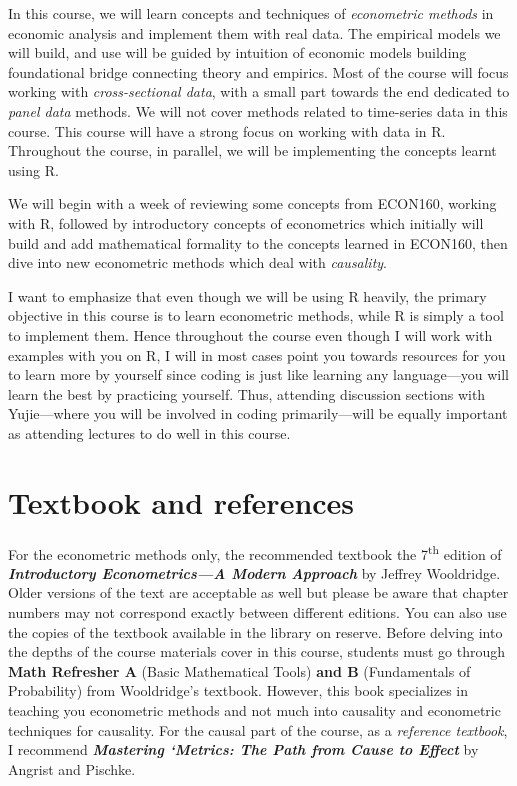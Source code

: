 \documentclass[11pt]{article}
\newcommand{\TAShort}{Yujie}
\begin{document}
In this course, we will learn concepts and techniques of \emph{econometric
methods} in economic analysis and implement them with real data. The empirical
models we will build, and use will be guided by intuition of economic models
building foundational bridge connecting theory and empirics. Most of the course
will focus working with \emph{cross-sectional data}, with a small part towards
the end dedicated to \emph{panel data} methods. We will not cover methods
related to time-series data in this course. This course will have a strong focus
on working with data in R. Throughout the course, in parallel, we will be
implementing the concepts learnt using R.

We will begin with a week of reviewing some concepts from ECON160, working with
R, followed by introductory concepts of econometrics which initially will build
and add mathematical formality to the concepts learned in ECON160, then dive
into new econometric methods which deal with \emph{causality}.

I want to emphasize that even though we will be using R heavily, the primary
objective in this course is to learn econometric methods, while R is simply a
tool to implement them. Hence throughout the course even though I will work with
examples with you on R, I will in most cases point you towards resources for you
to learn more by yourself since coding is just like learning any
language---you will learn the best by practicing yourself. Thus, attending
discussion sections with \TAShort---where you will be involved in coding
primarily---will be equally important as attending lectures to do well in this
course.

\section{Textbook and references}

For the econometric methods only, the recommended textbook the
7\textsuperscript{th} edition of \textbf{\emph{Introductory Econometrics---A
Modern Approach}} by Jeffrey Wooldridge. Older versions of the text are
acceptable as well but please be aware that chapter numbers may not correspond
exactly between different editions. You can also use the copies of the textbook
available in the library on reserve. Before delving into the depths of the
course materials cover in this course, students must go through \textbf{Math
Refresher A} (Basic Mathematical Tools) \textbf{and B} (Fundamentals of
Probability) from Wooldridge's textbook. However, this book specializes in
teaching you econometric methods and not much into causality and econometric
techniques for causality. For the causal part of the course, as a \emph{reference
textbook}, I recommend \textbf{\emph{Mastering `Metrics: The Path from Cause to
Effect}} by Angrist and Pischke.
\end{document}
